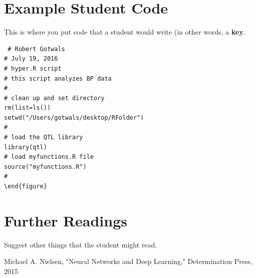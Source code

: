 \documentclass[11pt]{article}
\begin{document}
\section{Example Student Code}

This is where you put code that a student would write (in other words, a \textbf{key}.

\begin{verbatim}
 # Robert Gotwals
# July 19, 2016
# hyper.R script
# this script analyzes BP data
#
# clean up and set directory
rm(list=ls())
setwd("/Users/gotwals/desktop/RFolder")
#
# load the QTL library
library(qtl)
# load myfunctions.R file
source("myfunctions.R")
#
\end{figure}
\end{verbatim}

\section{Further Readings}

Suggest other things that the student might read.

\begin{thebibliography}{99}

Michael A. Nielsen, "Neural Networks and Deep Learning," Determination Press, 2015

\end{thebibliography}


\printnomenclature
\end{document}
